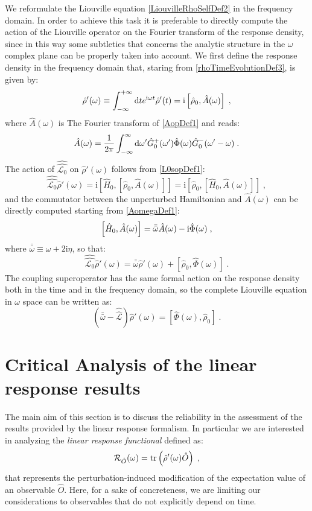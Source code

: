\documentclass[a4paper]{article}
\newcommand{\dd}{{\rm d}}
\newcommand{\bomega}{\bar\omega}
\newcommand{\bbomega}{\bar{\bomega}}
\newcommand{\ii}{\mathrm{i}}
\newcommand{\intover}[1]{\int_{-\infty}^{+\infty} \dd {#1}}
\newcommand{\be}{\begin{equation}}
\newcommand{\ee}{\end{equation}}
\newcommand{\nn}{\notag}
\newcommand{\lb}{\label}
\newcommand{\op}[1]{\hat {#1}}
\newcommand{\sop}[1]{\op{\op {#1}}}
\newcommand{\commutator}[2]{\left[ {#1} , {#2} \right]}
\newcommand{\trace}[1]{\mathrm{tr}\left(#1\right)}
\newcommand{\dmnot}{\op{\rho}_0}
\newcommand{\dm}{\op{\rho}}
\newcommand{\hnot}{\op{H}_0}
\newcommand{\Liouv}{\sop{\mathcal L}}
\newcommand{\Liouvnot}{\sop{\mathcal L_0}}
\begin{document}
We reformulate the Liouville equation \eqref{LiouvilleRhoSelfDef2} in the frequency domain. In order to achieve this task it is
preferable to directly compute the action of the Liouville operator on the Fourier transform of the response density, since in this
way some subtleties that concerns the analytic structure in the $\omega$ complex plane can be properly taken into account.
We first define the response density in the frequency domain that, staring from \eqref{rhoTimeEvolutionDef3}, is given by:
\be\lb{rhoPrimeOmegaDef1}
\dm'(\omega) \equiv \intover{t} e^{\ii \omega t} \dm'(t)
= \ii \commutator{\dmnot}{\op A(\omega)} \;,
\ee
where $\op A(\omega)$ is The Fourier transform of \eqref{AopDef1} and reads:
\be \lb{AomegaDef1}
\op A(\omega) = \frac{1}{2\pi} \int_{-\infty}^\infty  \dd \omega'
\op G_0^+(\omega') \op \Phi(\omega) \op G_0^-(\omega'-\omega)\;.
\ee
The action of $\Liouvnot$ on $\dm'(\omega)$ follows from \eqref{L0sopDef1}:
\be\lb{LiouvillianRhopomegaDef1}
\Liouvnot \dm'(\omega) = \ii \commutator{\hnot}{\commutator{\dmnot}{\op A(\omega)}} = 
\ii \commutator{\dmnot}{\commutator{\hnot}{\op A(\omega)}} \;,
\ee
and the commutator between the unperturbed Hamiltonian and $\op A(\omega)$ can be directly computed starting from \eqref{AomegaDef1}: 
\be
\commutator{\hnot }{\op A(\omega)} = \bbomega \op A(\omega) - \ii \op \Phi(\omega)\;, \nn
\ee
where $\bbomega \equiv \omega + 2\ii\eta$, so that:
\be\lb{LiouvillianRhopomegaDef2}
\Liouvnot \dm'(\omega) =  \bbomega\dm'(\omega) + \commutator{\dmnot}{\op\Phi(\omega)}\;.
\ee
The coupling superoperator has the same formal action on the response density both in the time and in the frequency domain, so the complete
Liouville equation in $\omega$ space can be written as:
\be\lb{LiouvillianRhopomegaDef3}
\left(\bbomega - \Liouv\right) \dm'(\omega) =  \commutator{\op\Phi(\omega)}{\dmnot}\;.
\ee

\section{Critical Analysis of the linear response results}

The main aim of this section is to discuss the reliability in the assessment of the results provided by the linear response formalism. In particular we are interested in 
analyzing the \emph{linear response functional} defined as:
\be\lb{LinearResponseFunctDef1}
{\cal R}_{\op O}(\omega) = \trace{\dm'(\omega)\op O} \;,
\ee
that represents the perturbation-induced modification of the expectation value of an observable $\op O$. Here, for a sake of concreteness, we are limiting our considerations 
to observables that do not explicitly depend on time. 
\end{document}
